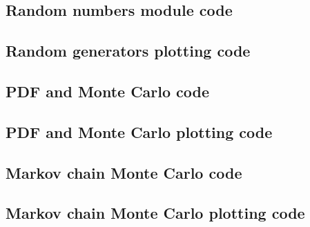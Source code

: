 \documentclass[twocolumn]{myarticle}
\begin{document}
\subsection{Random numbers module code}
\label{subsec:random_numbers_module_code}


\vspace{10pt}

\subsection{Random generators plotting code}
\label{subsec:random_generators_plotting_code}


\vspace{10pt}

\subsection{PDF and Monte Carlo code}
\label{subsec:pdf_and_monte_carlo_code}


\vspace{10pt}

\subsection{PDF and Monte Carlo plotting code}
\label{subsec:pdf_and_monte_carlo_plotting_code}


\vspace{10pt}

\subsection{Markov chain Monte Carlo code}
\label{subsec:markov_chain_monte_carlo_code}


\vspace{10pt}

\subsection{Markov chain Monte Carlo plotting code}
\label{subsec:markov_chain_monte_carlo_plotting_code}


\vspace{10pt}
\end{document}
